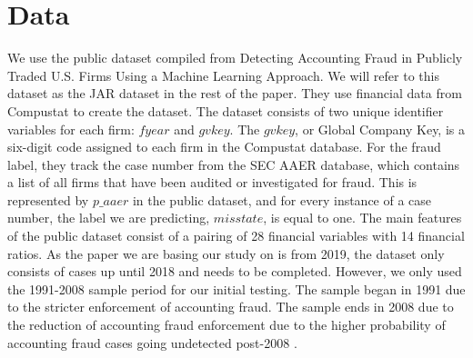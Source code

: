 \documentclass[conference]{IEEEtran}
\begin{document}
\section{Data}
We use the public dataset compiled from Detecting Accounting Fraud in Publicly Traded U.S. Firms Using a Machine Learning Approach. We will refer to this dataset as the JAR dataset in the rest of the paper. They use financial data from Compustat to create the dataset. The dataset consists of two unique identifier variables for each firm: $fyear$ and $gvkey$. The $gvkey$, or Global Company Key, is a six-digit code assigned to each firm in the Compustat database.  For the fraud label, they track the case number from the SEC AAER database, which contains a list of all firms that have been audited or investigated for fraud. This is represented by $p\_aaer$ in the public dataset, and for every instance of a case number, the label we are predicting, $misstate$, is equal to one. The main features of the public dataset consist of a pairing of 28 financial variables with 14 financial ratios. As the paper we are basing our study on is from 2019, the dataset only consists of cases up until 2018 and needs to be completed. However, we only used the 1991-2008 sample period for our initial testing. The sample began in 1991 due to the stricter enforcement of accounting fraud. The sample ends in 2008 due to the reduction of accounting fraud enforcement due to the higher probability of accounting fraud cases going undetected post-2008 \cite{b6}.  
\end{document}
